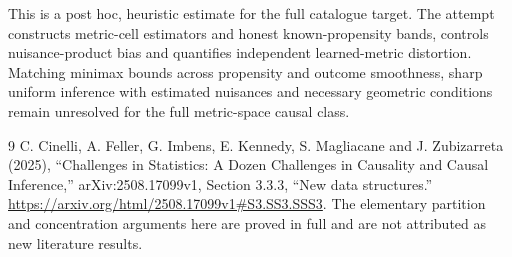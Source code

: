 \documentclass[11pt,a4paper]{article}
\theoremstyle{definition}
\theoremstyle{remark}
\begin{document}
This is a post hoc, heuristic estimate for the full catalogue target.
The attempt constructs metric-cell estimators and honest known-propensity bands, controls nuisance-product bias and quantifies independent learned-metric distortion. Matching minimax bounds across propensity and outcome smoothness, sharp uniform inference with estimated nuisances and necessary geometric conditions remain unresolved for the full metric-space causal class.

\begin{thebibliography}{9}
 C. Cinelli, A. Feller, G. Imbens, E. Kennedy, S. Magliacane and J. Zubizarreta (2025), ``Challenges in Statistics: A Dozen Challenges in Causality and Causal Inference,'' arXiv:2508.17099v1, Section 3.3.3, ``New data structures.'' \url{https://arxiv.org/html/2508.17099v1#S3.SS3.SSS3}. The elementary partition and concentration arguments here are proved in full and are not attributed as new literature results.
\end{thebibliography}
\end{document}
